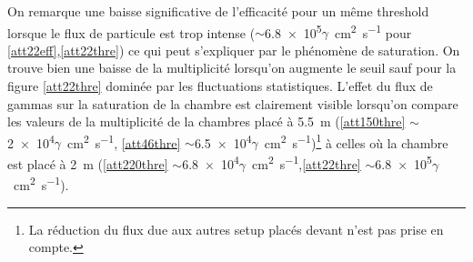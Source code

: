 On remarque une baisse significative de l'efficacité pour un même threshold lorsque le flux de particule est trop intense ($\sim$\num{6.8e5}$\gamma$\si{\per\square\centi\meter\per\second} pour \ref{att22eff},\ref{att22thre}) ce qui peut s'expliquer par le phénomène de saturation. On trouve bien une baisse de la multiplicité lorsqu'on augmente le seuil sauf pour la figure \ref{att22thre} dominée par les fluctuations statistiques. L'effet du flux de gammas sur la saturation de la chambre est clairement visible lorsqu'on compare les valeurs de la multiplicité de la chambres placé à \SI{5.5}{\meter} (\ref{att150thre} $\sim$\num{2e4}$\gamma$\si{\per\square\centi\meter\per\second}, \ref{att46thre} $\sim$\num{6.5e4}$\gamma$\si{\per\square\centi\meter\per\second})\footnote{La réduction du flux due aux autres setup placés devant n'est pas prise en compte.} à celles où la chambre est placé à \SI{2}{\meter} (\ref{att220thre} $\sim$\num{6.8e4}$\gamma$\si{\per\square\centi\meter\per\second},\ref{att22thre} $\sim$\num{6.8e5}$\gamma$\si{\per\square\centi\meter\per\second}).

